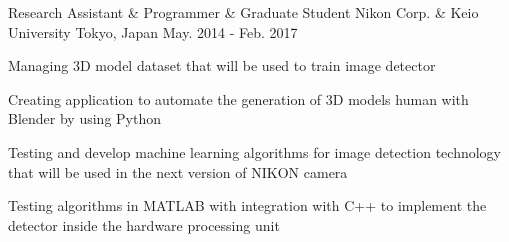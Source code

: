 \begin{cventries}
  \cventry
	{Research Assistant \& Programmer \& Graduate Student} %
	{Nikon Corp. \& Keio University} %
    {Tokyo, Japan} %
    {May. 2014 - Feb. 2017} %
    {
      \begin{cvitems} %
        \item {Managing 3D model dataset that will be used to train image detector}
        \item {Creating application to automate the generation of 3D models human with Blender by using Python}
        \item {Testing and develop machine learning algorithms for image detection technology that will be used in the next version of NIKON camera}
        \item {Testing algorithms in MATLAB with integration with C++ to implement the detector inside the hardware processing unit}
      \end{cvitems}
    }
%
\end{cventries}
